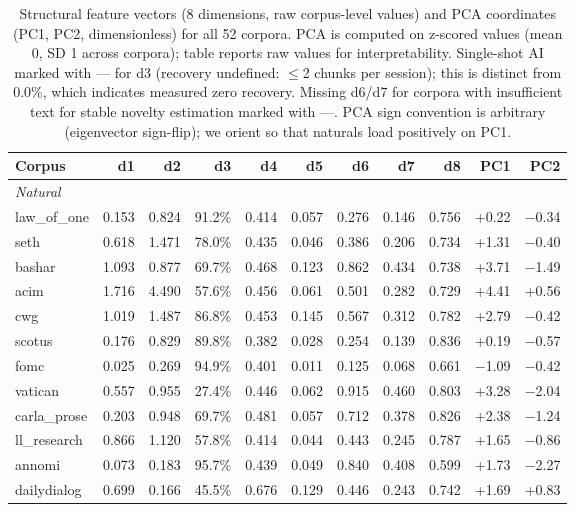 \documentclass[11pt]{article}
\begin{document}
\begin{table}[h!]
\centering
\small
\caption{Structural feature vectors (8 dimensions, raw corpus-level values) and PCA coordinates (PC1, PC2, dimensionless) for all 52 corpora. PCA is computed on z-scored values (mean 0, SD 1 across corpora); table reports raw values for interpretability. Single-shot AI marked with --- for d3 (recovery undefined: $\leq$2 chunks per session); this is distinct from 0.0\%, which indicates measured zero recovery. Missing d6/d7 for corpora with insufficient text for stable novelty estimation marked with ---. PCA sign convention is arbitrary (eigenvector sign-flip); we orient so that naturals load positively on PC1.}
\label{tbl:compact-vector}
\begin{tabular}{lrrrrrrrrrr}
\toprule
\textbf{Corpus} & \textbf{d1} & \textbf{d2} & \textbf{d3} & \textbf{d4} & \textbf{d5} & \textbf{d6} & \textbf{d7} & \textbf{d8} & \textbf{PC1} & \textbf{PC2} \\
\midrule
\multicolumn{11}{l}{\textit{Natural}} \\
law\_of\_one & 0.153 & 0.824 & 91.2\% & 0.414 & 0.057 & 0.276 & 0.146 & 0.756 & +0.22 & $-$0.34 \\
seth & 0.618 & 1.471 & 78.0\% & 0.435 & 0.046 & 0.386 & 0.206 & 0.734 & +1.31 & $-$0.40 \\
bashar & 1.093 & 0.877 & 69.7\% & 0.468 & 0.123 & 0.862 & 0.434 & 0.738 & +3.71 & $-$1.49 \\
acim & 1.716 & 4.490 & 57.6\% & 0.456 & 0.061 & 0.501 & 0.282 & 0.729 & +4.41 & +0.56 \\
cwg & 1.019 & 1.487 & 86.8\% & 0.453 & 0.145 & 0.567 & 0.312 & 0.782 & +2.79 & $-$0.42 \\
scotus & 0.176 & 0.829 & 89.8\% & 0.382 & 0.028 & 0.254 & 0.139 & 0.836 & +0.19 & $-$0.57 \\
fomc & 0.025 & 0.269 & 94.9\% & 0.401 & 0.011 & 0.125 & 0.068 & 0.661 & $-$1.09 & $-$0.42 \\
vatican & 0.557 & 0.955 & 27.4\% & 0.446 & 0.062 & 0.915 & 0.460 & 0.803 & +3.28 & $-$2.04 \\
carla\_prose & 0.203 & 0.948 & 69.7\% & 0.481 & 0.057 & 0.712 & 0.378 & 0.826 & +2.38 & $-$1.24 \\
ll\_research & 0.866 & 1.120 & 57.8\% & 0.414 & 0.044 & 0.443 & 0.245 & 0.787 & +1.65 & $-$0.86 \\
annomi & 0.073 & 0.183 & 95.7\% & 0.439 & 0.049 & 0.840 & 0.408 & 0.599 & +1.73 & $-$2.27 \\
dailydialog & 0.699 & 0.166 & 45.5\% & 0.676 & 0.129 & 0.446 & 0.243 & 0.742 & +1.69 & +0.83 \\

\end{tabular}
\end{table}
\end{document}
